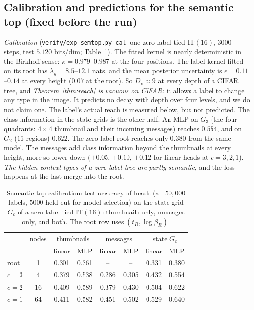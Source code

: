\documentclass[11pt]{article}
\theoremstyle{definition}
\begin{document}
\subsection{Calibration and predictions for the semantic top (fixed before the run)}\label{sec:semtop-pred}
\emph{Calibration} (\texttt{verify/exp\_semtop.py cal}, one zero-label tied $\mathrm{IT}(16)$, $3000$ steps, test
$5.120$ bits/dim; Table~\ref{tab:semtopcal}). The fitted kernel is nearly deterministic in the Birkhoff sense:
$\kappa=0.979$--$0.987$ at the four positions. The label kernel fitted on its root has
$\lambda_y=8.5$--$12.1$ nats, and the mean posterior uncertainty is $\epsilon=0.11$--$0.14$ at every height ($0.07$ at
the root). So $D_v\approx9$ at every depth of a CIFAR tree, and \emph{Theorem~\ref{thm:reach} is vacuous on
CIFAR}: it allows a label to change any type in the image. It predicts no decay with depth over four levels, and
we do not claim one. The label's actual reach is measured below, but not predicted.
The class information in the state grids is the other half. An MLP on $G_3$ (the four quadrants: $4\times4$ thumbnail
and their incoming messages) reaches $0.554$, and on $G_2$ ($16$ regions) $0.622$. The zero-label root reaches only
$0.380$ from the same model. The messages add class information beyond the thumbnails at every height, more so
lower down ($+0.05$, $+0.10$, $+0.12$ for linear heads at $c=3,2,1$). \emph{The hidden context types of a zero-label
tree are partly semantic}, and the loss happens at the last merge into the root.

\begin{table}[h]\centering
\caption{Semantic-top calibration: test accuracy of heads (all $50{,}000$ labels, $5000$ held out for model
selection) on the state grid $G_c$ of a zero-label tied $\mathrm{IT}(16)$: thumbnails only, messages only, and
both. The root row uses $(t_R,\log\beta_R)$.}\label{tab:semtopcal}
\small\begin{tabular}{l|c|cc|cc|cc}\toprule
& nodes & \multicolumn{2}{c|}{thumbnails} & \multicolumn{2}{c|}{messages} & \multicolumn{2}{c}{state $G_c$}\\
& & linear & MLP & linear & MLP & linear & MLP\\\midrule
root & 1 & 0.301 & 0.361 & -- & -- & 0.331 & 0.380\\
$c=3$ & 4 & 0.379 & 0.538 & 0.286 & 0.305 & 0.432 & 0.554\\
$c=2$ & 16 & 0.409 & 0.589 & 0.379 & 0.430 & 0.504 & 0.622\\
$c=1$ & 64 & 0.411 & 0.582 & 0.451 & 0.502 & 0.529 & 0.640\\
\bottomrule\end{tabular}
\end{table}
\end{document}
